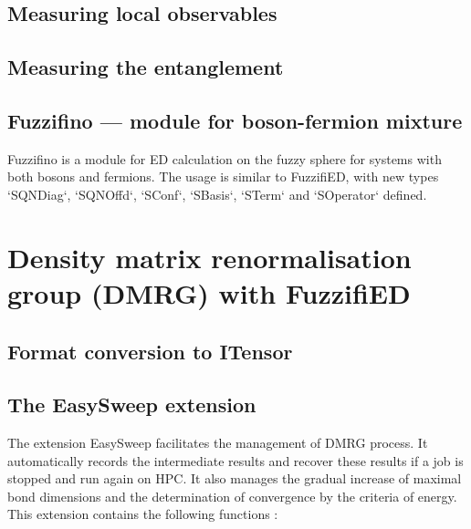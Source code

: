 \documentclass{timesjhep}
\begin{document}
\subsection{Measuring local observables}

\subsection{Measuring the entanglement}

\subsection{Fuzzifino --- module for boson-fermion mixture}

Fuzzifino is a module for ED calculation on the fuzzy sphere for systems with both bosons and fermions. The usage is similar to FuzzifiED, with new types `SQNDiag`, `SQNOffd`, `SConf`, `SBasis`, `STerm` and `SOperator` defined.

\section{Density matrix renormalisation group (DMRG) with FuzzifiED}
\label{sec:dmrg}

\subsection{Format conversion to ITensor}

\subsection{The EasySweep extension}

The extension EasySweep facilitates the management of DMRG process. It automatically records the intermediate results and recover these results if a job is stopped and run again on HPC. It also manages the gradual increase of maximal bond dimensions and the determination of convergence by the criteria of energy. This extension contains the following functions :
\end{document}
